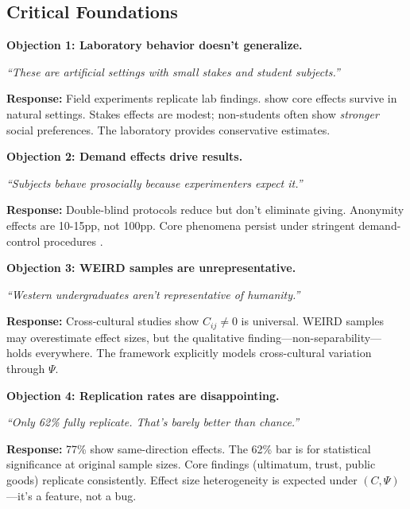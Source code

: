 
\subsection{Critical Foundations}
\label{sec:EV-foundations}

\begin{tcolorbox}[colback=red!5!white, colframe=red!75!black,
    title=\textbf{Critical Foundations: Objections and Responses}]

\textbf{Objection 1: Laboratory behavior doesn't generalize.}

\textit{``These are artificial settings with small stakes and student subjects.''}

\textbf{Response:} Field experiments replicate lab findings. \citet{levittlist2007}
show core effects survive in natural settings. Stakes effects are modest;
non-students often show \textit{stronger} social preferences. The laboratory
provides conservative estimates.

\medskip

\textbf{Objection 2: Demand effects drive results.}

\textit{``Subjects behave prosocially because experimenters expect it.''}

\textbf{Response:} Double-blind protocols reduce but don't eliminate giving.
Anonymity effects are 10-15pp, not 100pp. Core phenomena persist under
stringent demand-control procedures \citep{zizzo2010}.

\medskip

\textbf{Objection 3: WEIRD samples are unrepresentative.}

\textit{``Western undergraduates aren't representative of humanity.''}

\textbf{Response:} Cross-cultural studies \citep{henrich2000} show $C_{ij} \neq 0$
is universal. WEIRD samples may overestimate effect sizes, but the qualitative
finding---non-separability---holds everywhere. The framework explicitly
models cross-cultural variation through $\Psi$.

\medskip

\textbf{Objection 4: Replication rates are disappointing.}

\textit{``Only 62\% fully replicate. That's barely better than chance.''}

\textbf{Response:} 77\% show same-direction effects. The 62\% bar is for
statistical significance at original sample sizes. Core findings (ultimatum,
trust, public goods) replicate consistently. Effect size heterogeneity
is expected under $(C, \Psi)$---it's a feature, not a bug.

\end{tcolorbox}

